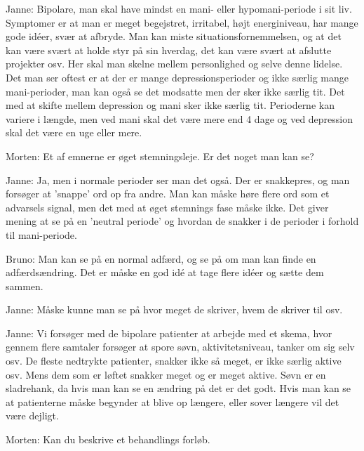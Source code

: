 Janne: Bipolare, man skal have mindst en mani- eller hypomani-periode i sit liv. Symptomer er at man er meget begejstret, irritabel, højt energiniveau, har mange gode idéer, svær at afbryde. Man kan miste situationsfornemmelsen, og at det kan være svært at holde styr på sin hverdag, det kan være svært at afslutte projekter osv. Her skal man skelne mellem personlighed og selve denne lidelse. Det man ser oftest er at der er mange depressionsperioder og ikke særlig mange mani-perioder, man kan også se det modsatte men der sker ikke særlig tit. Det med at skifte mellem depression og mani sker ikke særlig tit. Perioderne kan variere i længde, men ved mani skal det være mere end 4 dage og ved depression skal det være en uge eller mere. 

Morten: Et af emnerne er øget stemningsleje. Er det noget man kan se?

Janne: Ja, men i normale perioder ser man det også. Der er snakkepres, og man forsøger at 'snappe' ord op fra andre. Man kan måske høre flere ord som et advarsels signal, men det med at øget stemnings fase måske ikke. Det giver mening at se på en 'neutral periode' og hvordan de snakker i de perioder i forhold til mani-periode.

Bruno: Man kan se på en normal adfærd, og se på om man kan finde en adfærdsændring. Det er måske en god idé at tage flere idéer og sætte dem sammen.

Janne: Måske kunne man se på hvor meget de skriver, hvem de skriver til osv. 

Janne: Vi forsøger med de bipolare patienter at arbejde med et skema, hvor gennem flere samtaler forsøger at spore søvn, aktivitetsniveau, tanker om sig selv osv. De fleste nedtrykte patienter, snakker ikke så meget, er ikke særlig aktive osv. Mens dem som er løftet snakker meget og er meget aktive. Søvn er en sladrehank, da hvis man kan se en ændring på det er det godt. Hvis man kan se at patienterne måske begynder at blive op længere, eller sover længere vil det være dejligt.

Morten: Kan du beskrive et behandlings forløb.

